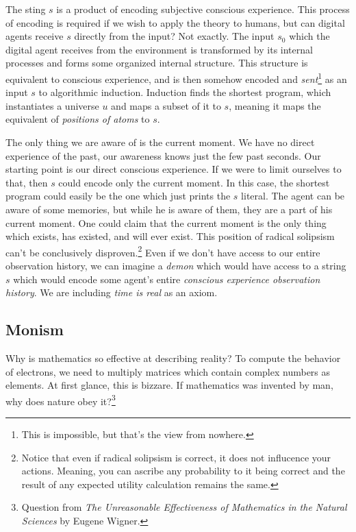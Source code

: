 \documentclass[oneside,hidelinks]{article}
\begin{document}
The sting $s$ is a product of encoding subjective conscious experience.
This process of encoding is required if we wish to apply the theory to humans, but can digital agents receive $s$ directly from the input?
Not exactly.
The input $s_0$ which the digital agent receives from the environment is transformed by its internal processes and forms some organized internal structure.
This structure is equivalent to conscious experience, and is then somehow encoded and \textit{sent}\footnote{This is impossible, but that's the view from nowhere.} as an input $s$ to algorithmic induction.
Induction finds the shortest program, which instantiates a universe $u$ and maps a subset of it to $s$, meaning it maps the equivalent of \textit{positions of atoms} to $s$.

The only thing we are aware of is the current moment.
We have no direct experience of the past, our awareness knows just the few past seconds.
Our starting point is our direct conscious experience.
If we were to limit ourselves to that, then $s$ could encode only the current moment.
In this case, the shortest program could easily be the one which just prints the $s$ literal.
The agent can be aware of some memories, but while he is aware of them, they are a part of his current moment.
One could claim that the current moment is the only thing which exists, has existed, and will ever exist.
This position of radical solipsism can't be conclusively disproven.\footnote{
Notice that even if radical solipsism is correct, it does not influcence your actions.
Meaning, you can ascribe any probability to it being correct and the result of any expected utility calculation remains the same.
}
Even if we don't have access to our entire observation history, we can imagine a \textit{demon} which would have access to a string $s$ which would encode some agent's entire \textit{conscious experience observation history}.
We are including \textit{time is real} as an axiom.

\newpage

\subsection{Monism}

Why is mathematics so effective at describing reality?
To compute the behavior of electrons, we need to multiply matrices which contain complex numbers as elements.
At first glance, this is bizzare.
If mathematics was invented by man, why does nature obey it?\footnote{Question from \textit{The Unreasonable Effectiveness of Mathematics in the Natural Sciences} by Eugene Wigner.}
\end{document}
